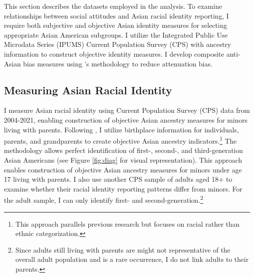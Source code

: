 This section describes the datasets employed in the analysis. To examine relationships between social attitudes and Asian racial identity reporting, I require both subjective and objective Asian identity measures for selecting appropriate Asian American subgroups. I utilize the Integrated Public Use Microdata Series (IPUMS) Current Population Survey (CPS) \autocite{floodsarahIntegratedPublicUse2021a} with ancestry information to construct objective identity measures. I develop composite anti-Asian bias measures using \textcite{lubotskyInterpretationRegressionsMultiple2006}'s methodology to reduce attenuation bias.

\subsection{Measuring Asian Racial Identity}\label{subsec:cps}

I measure Asian racial identity using Current Population Survey (CPS) data from 2004-2021, enabling construction of objective Asian ancestry measures for minors living with parents. Following \textcite{antmanEthnicAttritionObserved2016,antmanEthnicAttritionAssimilation2020}, I utilize birthplace information for individuals, parents, and grandparents to create objective Asian ancestry indicators.\footnote{This approach parallels previous research but focuses on racial rather than ethnic categorization.} The methodology allows perfect identification of first-, second-, and third-generation Asian Americans (see Figure \ref{fig:diag} for visual representation). This approach enables construction of objective Asian ancestry measures for minors under age 17 living with parents. I also use another CPS sample of adults aged 18+ to examine whether their racial identity reporting patterns differ from minors. For the adult sample, I can only identify first- and second-generation.\footnote{Since adults still living with parents are might not representative of the overall adult population and is a rare occurrence, I do not link adults to their parents.}

